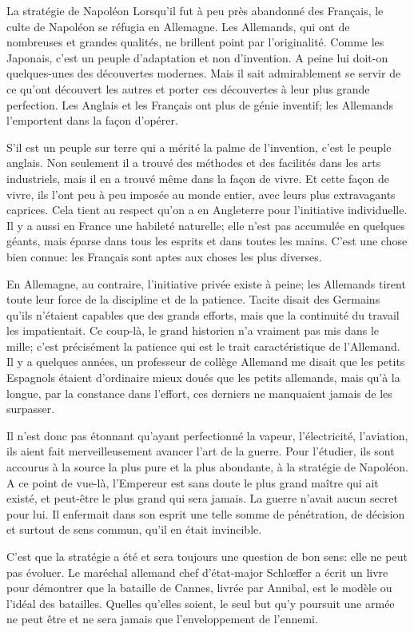 \begin{chapter}{La stratégie de Napoléon}
Lorsqu'il fut à peu près abandonné des Français, le culte de Napoléon se
réfugia en Allemagne. Les Allemands, qui ont de nombreuses et grandes
qualités, ne brillent point par l'originalité. Comme les Japonais,
c'est un peuple d'adaptation et non d'invention. A peine lui doit-on
quelques-unes des découvertes modernes. Mais il sait admirablement se
servir de ce qu'ont découvert les autres et porter ces découvertes à
leur plus grande perfection. Les Anglais et les Français ont plus de
génie inventif; les Allemands l'emportent dans la façon d'opérer.

S'il est un peuple sur terre qui a mérité la palme de l'invention, c'est
le peuple anglais. Non seulement il a trouvé des méthodes et des
facilités dans les arts industriels, mais il en a trouvé même dans la
façon de vivre. Et cette façon de vivre, ils l'ont peu à peu imposée au
monde entier, avec leurs plus extravagants caprices. Cela tient au
respect qu'on a en Angleterre pour l'initiative individuelle. Il y a
aussi en France une habileté naturelle; elle n'est pas accumulée en
quelques géants, mais éparse dans tous les esprits et dans toutes les
mains. C'est une chose bien connue: les Français sont aptes aux choses
les plus diverses.

En Allemagne, au contraire, l'initiative privée existe à peine; les
Allemands tirent toute leur force de la discipline et de la patience.
Tacite disait des Germains qu'ils n'étaient capables que des grands
efforts, mais que la continuité du travail les impatientait. Ce coup-là,
le grand historien n'a vraiment pas mis dans le mille; c'est précisément
la patience qui est le trait caractéristique de l'Allemand. Il y a
quelques années, un professeur de collège Allemand me disait que les
petits Espagnols étaient d'ordinaire mieux doués que les petits
allemands, mais qu'à la longue, par la constance dans l'effort, ces
derniers ne manquaient jamais de les surpasser.

Il n'est donc pas étonnant qu'ayant perfectionné la vapeur,
l'électricité, l'aviation, ils aient fait merveilleusement avancer
l'art de la guerre. Pour l'étudier, ils sont accourus à la source la
plus pure et la plus abondante, à la stratégie de Napoléon. A ce point
de vue-là, l'Empereur est sans doute le plus grand maître qui ait
existé, et peut-être le plus grand qui sera jamais. La guerre n'avait
aucun secret pour lui. Il enfermait dans son esprit une telle somme de
pénétration, de décision et surtout de sens commun, qu'il en était
invincible.

C'est que la stratégie a été et sera toujours une question de bon sens:
elle ne peut pas évoluer. Le maréchal allemand chef d'état-major
Schlœffer a écrit un livre pour démontrer que la bataille de Cannes,
livrée par Annibal, est le modèle ou l'idéal des batailles. Quelles
qu'elles soient, le seul but qu'y poursuit une armée ne peut être et ne
sera jamais que l'enveloppement de l'ennemi.


\end{chapter}
